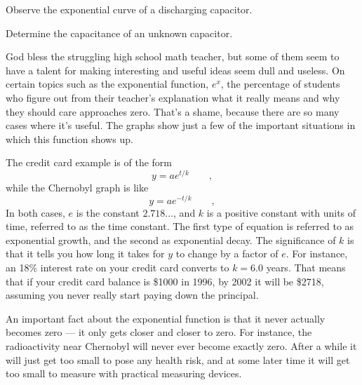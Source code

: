 \label{lab:rc}

\apparatus
{}

\begin{goals}

\item[] Observe the exponential curve of a discharging capacitor.

\item[] Determine the capacitance of an unknown capacitor.
\end{goals}

\introduction

God bless the struggling high school math teacher, but some
of them seem to have a talent for making interesting and
useful ideas seem dull and useless. On certain topics such
as the exponential function, $e^x$, the percentage of students
who figure out from their teacher's explanation what it
really means and why they should care approaches zero.
That's a shame, because there are so many cases where it's
useful. The graphs show just a few of the important
situations in which this function shows up.


The credit card example is of the form
\begin{equation*}
    y=ae^{t/k}   \qquad   ,
\end{equation*}
while the Chernobyl graph is like
\begin{equation*}
    y=ae^{-t/k}    \qquad   ,
\end{equation*}
In both cases, $e$ is the constant $2.718\ldots$, and $k$ is a
positive constant with units of time, referred to as the
time constant. The first type of equation is referred to as
exponential growth, and the second as exponential decay. The
significance of $k$ is that it tells you how long it takes
for $y$ to change by a factor of $e$. For instance, an 18\%
interest rate on your credit card converts to $k=6.0$ years.
That means that if your credit card balance is \$1000 in
1996, by 2002 it will be \$2718, assuming you never really
start paying down the principal.

An important fact about the exponential function is that it
never actually becomes zero --- it only gets closer and
closer to zero. For instance, the radioactivity near
Chernobyl will never ever become exactly zero. After a while
it will just get too small to pose any health risk, and at
some later time it will get too small to measure with
practical measuring devices.

